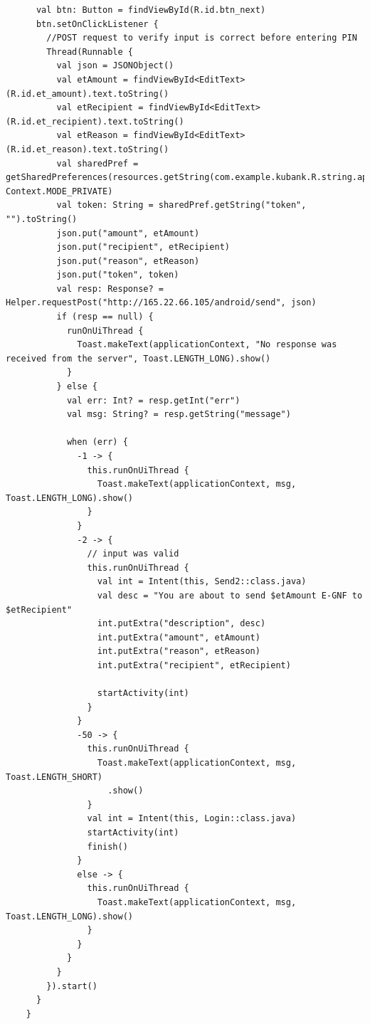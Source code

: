 \documentclass[11pt, a4paper]{article}
\begin{document}
\begin{appendices}
\begin{lstlisting}
      val btn: Button = findViewById(R.id.btn_next)
      btn.setOnClickListener {
        //POST request to verify input is correct before entering PIN
        Thread(Runnable {
          val json = JSONObject()
          val etAmount = findViewById<EditText>(R.id.et_amount).text.toString()
          val etRecipient = findViewById<EditText>(R.id.et_recipient).text.toString()
          val etReason = findViewById<EditText>(R.id.et_reason).text.toString()
          val sharedPref = getSharedPreferences(resources.getString(com.example.kubank.R.string.app_name), Context.MODE_PRIVATE)
          val token: String = sharedPref.getString("token", "").toString()
          json.put("amount", etAmount)
          json.put("recipient", etRecipient)
          json.put("reason", etReason)
          json.put("token", token)
          val resp: Response? = Helper.requestPost("http://165.22.66.105/android/send", json)
          if (resp == null) {
            runOnUiThread {
              Toast.makeText(applicationContext, "No response was received from the server", Toast.LENGTH_LONG).show()
            }
          } else {
            val err: Int? = resp.getInt("err")
            val msg: String? = resp.getString("message")
  
            when (err) {
              -1 -> {
                this.runOnUiThread {
                  Toast.makeText(applicationContext, msg, Toast.LENGTH_LONG).show()
                }
              }
              -2 -> {
                // input was valid
                this.runOnUiThread {
                  val int = Intent(this, Send2::class.java)
                  val desc = "You are about to send $etAmount E-GNF to $etRecipient"
                  int.putExtra("description", desc)
                  int.putExtra("amount", etAmount)
                  int.putExtra("reason", etReason)
                  int.putExtra("recipient", etRecipient)
  
                  startActivity(int)
                }
              }
              -50 -> {
                this.runOnUiThread {
                  Toast.makeText(applicationContext, msg, Toast.LENGTH_SHORT)
                    .show()
                }
                val int = Intent(this, Login::class.java)
                startActivity(int)
                finish()
              }
              else -> {
                this.runOnUiThread {
                  Toast.makeText(applicationContext, msg, Toast.LENGTH_LONG).show()
                }
              }
            }
          }
        }).start()
      }
    }
  

\end{lstlisting}
\end{appendices}
\end{document}
